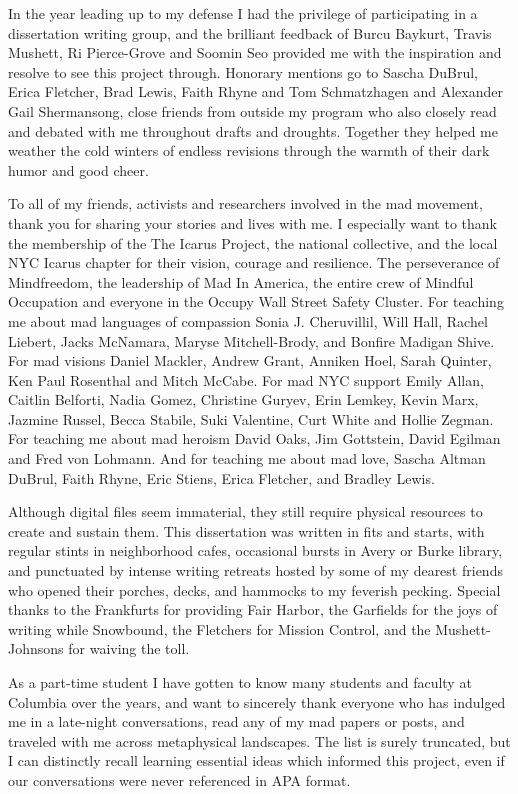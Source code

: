 In the year leading up to my defense I had the privilege of
participating in a dissertation writing group, and the brilliant
feedback of Burcu Baykurt, Travis Mushett, Ri Pierce-Grove and Soomin
Seo provided me with the inspiration and resolve to see this project
through. Honorary mentions go to Sascha DuBrul, Erica Fletcher, Brad
Lewis, Faith Rhyne and Tom Schmatzhagen and Alexander Gail Shermansong,
close friends from outside my program who also closely read and debated
with me throughout drafts and droughts. Together they helped me weather
the cold winters of endless revisions through the warmth of their dark
humor and good cheer.

To all of my friends, activists and researchers involved in the mad
movement, thank you for sharing your stories and lives with me. I
especially want to thank the membership of the The Icarus Project, the
national collective, and the local NYC Icarus chapter for their vision,
courage and resilience. The perseverance of Mindfreedom, the leadership
of Mad In America, the entire crew of Mindful Occupation and everyone in
the Occupy Wall Street Safety Cluster. For teaching me about mad
languages of compassion Sonia J. Cheruvillil, Will Hall, Rachel Liebert,
Jacks McNamara, Maryse Mitchell-Brody, and Bonfire Madigan Shive. For
mad visions Daniel Mackler, Andrew Grant, Anniken Hoel, Sarah Quinter,
Ken Paul Rosenthal and Mitch McCabe. For mad NYC support Emily Allan,
Caitlin Belforti, Nadia Gomez, Christine Guryev, Erin Lemkey, Kevin
Marx, Jazmine Russel, Becca Stabile, Suki Valentine, Curt White and
Hollie Zegman. For teaching me about mad heroism David Oaks, Jim
Gottstein, David Egilman and Fred von Lohmann. And for teaching me about
mad love, Sascha Altman DuBrul, Faith Rhyne, Eric Stiens, Erica
Fletcher, and Bradley Lewis.

Although digital files seem immaterial, they still require physical
resources to create and sustain them. This dissertation was written in
fits and starts, with regular stints in neighborhood cafes, occasional
bursts in Avery or Burke library, and punctuated by intense writing
retreats hosted by some of my dearest friends who opened their porches,
decks, and hammocks to my feverish pecking. Special thanks to the
Frankfurts for providing Fair Harbor, the Garfields for the joys of
writing while Snowbound, the Fletchers for Mission Control, and the
Mushett-Johnsons for waiving the toll.

As a part-time student I have gotten to know many students and faculty
at Columbia over the years, and want to sincerely thank everyone who has
indulged me in a late-night conversations, read any of my mad papers or
posts, and traveled with me across metaphysical landscapes. The list is
surely truncated, but I can distinctly recall learning essential ideas
which informed this project, even if our conversations were never
referenced in APA format.

